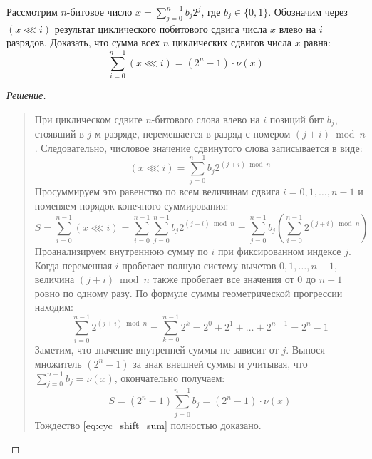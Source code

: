 \begin{problem}
    Рассмотрим $n$-битовое число $x = \sum_{j=0}^{n-1} b_j 2^j$, где 
    $b_j \in \{0, 1\}$. Обозначим через $(x \lll i)$ результат 
    циклического побитового сдвига числа $x$ влево на $i$ разрядов. 
    Доказать, что сумма всех $n$ циклических сдвигов числа $x$ равна:
    \begin{equation} \label{eq:cyc_shift_sum}
        \sum_{i=0}^{n-1} (x \lll i) = (2^n - 1) \cdot \nu(x) \tag{10}
    \end{equation}
\end{problem}

\begin{proof}[Решение]~\\
    \begin{quote}
        При циклическом сдвиге $n$-битового слова влево на $i$ позиций бит 
        $b_j$, стоявший в $j$-м разряде, перемещается в разряд с номером 
        $(j + i) \bmod n$. Следовательно, числовое значение сдвинутого 
        слова записывается в виде:
        \[
            (x \lll i) = \sum_{j=0}^{n-1} b_j 2^{(j+i) \bmod n}
        \]
        Просуммируем это равенство по всем величинам сдвига 
        $i = 0, 1, \dots, n - 1$ и поменяем порядок конечного суммирования:
        \[
            S = \sum_{i=0}^{n-1} (x \lll i) = 
            \sum_{i=0}^{n-1} \sum_{j=0}^{n-1} b_j 2^{(j+i) \bmod n} = 
            \sum_{j=0}^{n-1} b_j \left( \sum_{i=0}^{n-1} 2^{(j+i) \bmod n} \right)
        \]
        Проанализируем внутреннюю сумму по $i$ при фиксированном индексе 
        $j$. Когда переменная $i$ пробегает полную систему вычетов 
        $0, 1, \dots, n - 1$, величина $(j + i) \bmod n$ также пробегает 
        все значения от $0$ до $n - 1$ ровно по одному разу. По формуле 
        суммы геометрической прогрессии находим:
        \[
            \sum_{i=0}^{n-1} 2^{(j+i) \bmod n} = 
            \sum_{k=0}^{n-1} 2^k = 2^0 + 2^1 + \dots + 2^{n-1} = 2^n - 1
        \]
        Заметим, что значение внутренней суммы не зависит от $j$. Вынося 
        множитель $(2^n - 1)$ за знак внешней суммы и учитывая, что 
        $\sum_{j=0}^{n-1} b_j = \nu(x)$, окончательно получаем:
        \[
            S = (2^n - 1) \sum_{j=0}^{n-1} b_j = (2^n - 1) \cdot \nu(x)
        \]
        Тождество \eqref{eq:cyc_shift_sum} полностью доказано.
    \end{quote}
\end{proof}